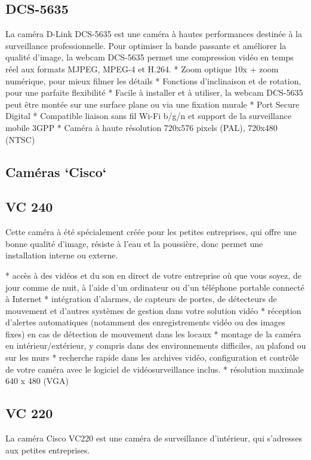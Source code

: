 	\subsection{DCS-5635}
La caméra D-Link DCS-5635 est une caméra à hautes performances destinée à la
surveillance professionnelle.
Pour optimiser la bande passante et améliorer la qualité d'image, la webcam
DCS-5635 permet une compression vidéo en temps réel aux formats MJPEG, MPEG-4 et
H.264.
    * Zoom optique 10x + zoom numérique, pour mieux filmer les détails
    * Fonctions d'inclinaison et de rotation, pour une parfaite flexibilité
    * Facile à installer et à utiliser, la webcam DCS-5635 peut être montée sur une surface plane ou via une fixation murale
    * Port Secure Digital
    * Compatible liaison sans fil Wi-Fi b/g/n et support de la surveillance mobile 3GPP
    * Caméra à haute résolution 720x576 pixels (PAL), 720x480 (NTSC)

\subsection{Caméras `Cisco`}
	\subsection{VC 240}
Cette caméra à été spécialement créée pour les petites entreprises, qui offre
une bonne qualité d'image, résiste à l'eau et la poussière, donc permet une
installation interne ou externe.

    * accès à des vidéos et du son en direct de votre entreprise où que vous
    soyez, de jour comme de nuit, à l'aide d'un ordinateur ou d'un téléphone
    portable connecté à Internet 
    * intégration d'alarmes, de capteurs de portes, de détecteurs de mouvement
    et d'autres systèmes de gestion dans votre solution vidéo 
    * réception d'alertes automatiques (notamment des enregistrements vidéo ou
    des images fixes) en cas de détection de mouvement dans les locaux
    * montage de la caméra en intérieur/extérieur, y compris dans des
    environnements difficiles, au plafond ou sur les murs
    * recherche rapide dans les archives vidéo, configuration et contrôle de
    votre caméra avec le logiciel de vidéosurveillance inclus.
	* résolution maximale 640 x 480 (VGA)
	
	\subsection{VC 220}
La caméra Cisco VC220 est une caméra de surveillance d'intérieur, qui s'adresses
aux petites entreprises.

